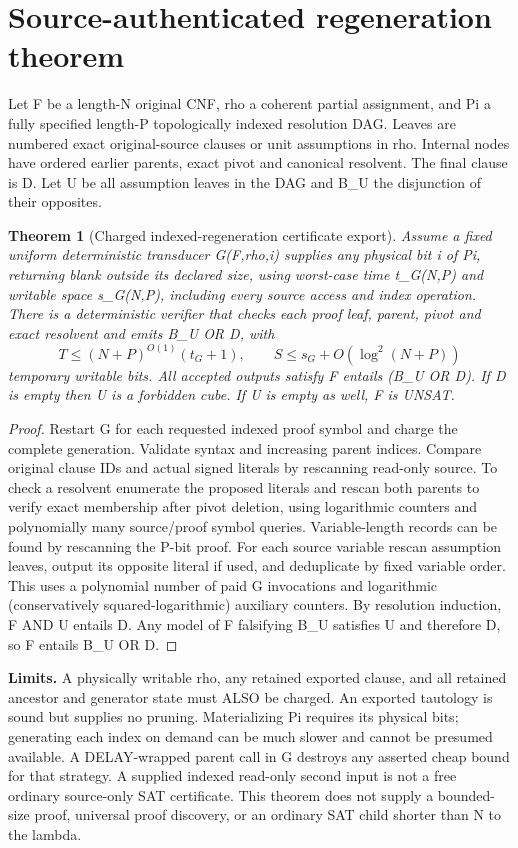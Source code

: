 \documentclass[11pt]{article}
\newtheorem{theorem}{Theorem}\newtheorem{lemma}[theorem]{Lemma}
\begin{document}
\section{Source-authenticated regeneration theorem}
Let F be a length-N original CNF, rho a coherent partial assignment, and Pi a fully specified length-P topologically indexed resolution DAG. Leaves are numbered exact original-source clauses or unit assumptions in rho. Internal nodes have ordered earlier parents, exact pivot and canonical resolvent. The final clause is D. Let U be all assumption leaves in the DAG and B_U the disjunction of their opposites.
\begin{theorem}[Charged indexed-regeneration certificate export]
Assume a fixed uniform deterministic transducer G(F,rho,i) supplies any physical bit i of Pi, returning blank outside its declared size, using worst-case time t_G(N,P) and writable space s_G(N,P), including every source access and index operation. There is a deterministic verifier that checks each proof leaf, parent, pivot and exact resolvent and emits B_U OR D, with
\[
T\le(N+P)^{O(1)}(t_G+1),\qquad
S\le s_G+O(\log^2(N+P))
\]
temporary writable bits. All accepted outputs satisfy F entails (B_U OR D). If D is empty then U is a forbidden cube. If U is empty as well, F is UNSAT.
\end{theorem}
\begin{proof}
Restart G for each requested indexed proof symbol and charge the complete generation. Validate syntax and increasing parent indices. Compare original clause IDs and actual signed literals by rescanning read-only source. To check a resolvent enumerate the proposed literals and rescan both parents to verify exact membership after pivot deletion, using logarithmic counters and polynomially many source/proof symbol queries. Variable-length records can be found by rescanning the P-bit proof. For each source variable rescan assumption leaves, output its opposite literal if used, and deduplicate by fixed variable order. This uses a polynomial number of paid G invocations and logarithmic (conservatively squared-logarithmic) auxiliary counters. By resolution induction, F AND U entails D. Any model of F falsifying B_U satisfies U and therefore D, so F entails B_U OR D.
\end{proof}
\noindent\textbf{Limits.} A physically writable rho, any retained exported clause, and all retained ancestor and generator state must ALSO be charged. An exported tautology is sound but supplies no pruning. Materializing Pi requires its physical bits; generating each index on demand can be much slower and cannot be presumed available. A DELAY-wrapped parent call in G destroys any asserted cheap bound for that strategy. A supplied indexed read-only second input is not a free ordinary source-only SAT certificate. This theorem does not supply a bounded-size proof, universal proof discovery, or an ordinary SAT child shorter than N to the lambda.
\end{document}
